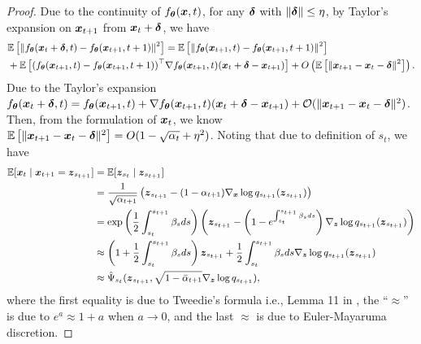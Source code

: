 \begin{proof}
	Due to the continuity of $f_{\boldsymbol{\theta}}(\boldsymbol{x}, t)$, for any $\boldsymbol{\delta}$ with $\|\boldsymbol{\delta}\|\leq \eta$, by Taylor's expansion on $\boldsymbol{x}_{t +1}$ from $\boldsymbol{x}_{t} + \boldsymbol{\delta}$, we have  
	\begin{equation}\label{eq:taylor expansion}
		\small
		\begin{aligned}
			& \mathbb{E}\left[\left\|f_{\boldsymbol{\theta}}(\boldsymbol{x}_{t} + \boldsymbol{\delta}, t) - f_{\boldsymbol{\theta}}(\boldsymbol{x}_{t + 1}, t + 1)\right\|^{2}\right] = \mathbb{E}\left[\left\|f_{\boldsymbol{\theta}}(\boldsymbol{x}_{t + 1}, t) - f_{\boldsymbol{\theta}}(\boldsymbol{x}_{t + 1}, t + 1)\right\|^{2}\right] \\
			& + \mathbb{E}\left[(f_{\boldsymbol{\theta}}(\boldsymbol{x}_{t + 1}, t) - f_{\boldsymbol{\theta}}(\boldsymbol{x}_{t + 1}, t + 1))^{\top}\nabla f_{\boldsymbol{\theta}}(\boldsymbol{x}_{t + 1}, t)(\boldsymbol{x}_{t} + \boldsymbol{\delta} - \boldsymbol{x}_{t + 1})\right] +  O\left(\mathbb{E}\left[\|\boldsymbol{x}_{t + 1} - \boldsymbol{x}_{t} - \boldsymbol{\delta}\|^{2}\right]\right).
		\end{aligned}
	\end{equation}
    Due to the Taylor's expansion $f_{\boldsymbol{\theta}}(\boldsymbol{x}_{t} + \boldsymbol{\delta}, t) = f_{\boldsymbol{\theta}}(\boldsymbol{x}_{t + 1}, t) + \nabla f_{\boldsymbol{\theta}}(\boldsymbol{x}_{t + 1}, t)(\boldsymbol{x}_{t} + \boldsymbol{\delta} - \boldsymbol{x}_{t + 1}) + \mathcal{O}(\|\boldsymbol{x}_{t + 1} - \boldsymbol{x}_{t} - \boldsymbol{\delta}\|^{2})$. Then, from the formulation of $\boldsymbol{x}_{t}$, we know $\mathbb{E}\left[\|\boldsymbol{x}_{t + 1} - \boldsymbol{x}_{t} - \boldsymbol{\delta}\|^{2}\right] =  O(1 - \sqrt{\alpha_{t}} + \eta^{2})$. Noting that due to definition of $s_{t}$, we have 
	\begin{equation}\label{eq:approximation}
		\small
		\begin{aligned}
			\mathbb{E}[\boldsymbol{x}_{t}\mid \boldsymbol{x}_{t + 1} = \boldsymbol{z}_{s_{t + 1}}] 
            & = \mathbb{E}[\boldsymbol{z}_{s_t}\mid \boldsymbol{z}_{s_{t + 1}}] \\
            & = \frac{1}{\sqrt{\alpha_{t + 1}}}\left(\boldsymbol{z}_{s_{t + 1}} - (1 - \alpha_{t + 1})\nabla_{\boldsymbol{x}}\log{q_{s_{t + 1}}(\boldsymbol{z}_{s_{t + 1}})}\right) \\
			& = \exp\left(\frac{1}{2}\int_{s_{t}}^{s_{t + 1}}\beta_{s}ds\right)\left(\boldsymbol{z}_{s_{t + 1}} - \left(1 - e^{\int_{s_{t}}^{s_{t + 1}}\beta_{s}ds}\right)\nabla_{\boldsymbol{z}}\log{q_{s_{t + 1}}(\boldsymbol{z}_{s_{t + 1}})}\right) \\
			& \approx \left(1 + \frac{1}{2}\int_{s_{t}}^{s_{t + 1}}\beta_{s}ds\right)\boldsymbol{z}_{s_{t + 1}} + \frac{1}{2}\int_{s_{t}}^{s_{t + 1}}\beta_{s}ds\nabla_{\boldsymbol{z}}\log{q_{s_{t + 1}}(\boldsymbol{z}_{s_{t + 1}})} \\
			& \approx \hat{\Psi}_{s_{t}}(\boldsymbol{z}_{s_{t + 1}}, \sqrt{1 - \bar{\alpha}_{t + 1}}\nabla_{\boldsymbol{z}}\log{q_{s_{t + 1}}}),
		\end{aligned}
	\end{equation}
    where the first equality is due to  Tweedie’s formula i.e., Lemma 11 in \citep{bao2022analytic}, the ``$\approx$'' is due to $e^{a}\approx 1 + a$ when $a\to 0$, and the last $\approx$ is due to Euler-Mayaruma discretion.

\end{proof}
